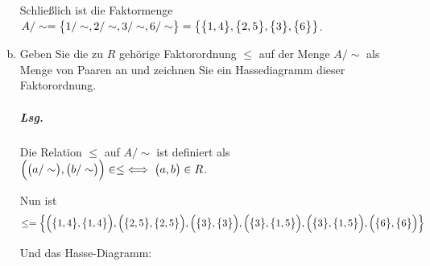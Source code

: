 \documentclass{scrreprt}
\begin{document}
\begin{enumerate}[(a)]
  Schließlich ist die Faktormenge $A / \sim = \qty\big{1 / \sim, 2 / \sim, 3 / \sim, 6 / \sim}
  = \qty{\qty\big{1, 4}, \qty\big{2, 5}, \qty\big{3}, \qty\big{6}}$.

\newpage
\item Geben Sie die zu $R$ gehörige Faktorordnung $\leq$ auf der Menge
  $A/\sim$ als Menge von Paaren an und zeichnen Sie ein Hassediagramm dieser
  Faktorordnung.

  \subparagraph{Lsg.} Die Relation $\leq$ auf $A / \sim$ ist definiert als
  $\qty\Big(\qty\big(a/\sim), \qty\big(b/\sim)) \in \leq \iff \qty\big(a, b) \in R$.

  Nun ist
  \[
    \leq = \qty{
      \qty\Big(\qty\big{1, 4}, \qty\big{1, 4}),
      \qty\Big(\qty\big{2, 5}, \qty\big{2, 5}),
      \qty\Big(\qty\big{3}, \qty\big{3}),
      \qty\Big(\qty\big{3}, \qty\big{1, 5}),
      \qty\Big(\qty\big{3}, \qty\big{1, 5}),
      \qty\Big(\qty\big{6}, \qty\big{6})
    }
  \]

  Und das Hasse-Diagramm:

\end{enumerate}
\end{document}

